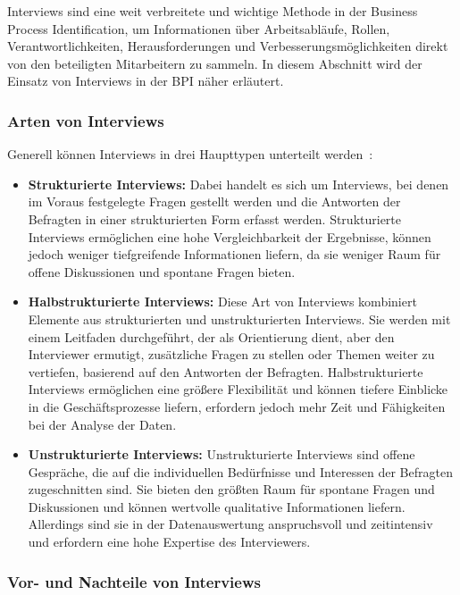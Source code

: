 Interviews sind eine weit verbreitete und wichtige Methode in der Business Process Identification, um Informationen über Arbeitsabläufe, Rollen, Verantwortlichkeiten, Herausforderungen und Verbesserungsmöglichkeiten direkt von den beteiligten Mitarbeitern zu sammeln. In diesem Abschnitt wird der Einsatz von Interviews in der BPI näher erläutert.

\subsubsection{Arten von Interviews}
Generell können Interviews in drei Haupttypen unterteilt werden~\cite[P.9]{Yousuf2015}:

\begin{itemize}
    \item \textbf{Strukturierte Interviews:} Dabei handelt es sich um Interviews, bei denen im Voraus festgelegte Fragen gestellt werden und die Antworten der Befragten in einer strukturierten Form erfasst werden. Strukturierte Interviews ermöglichen eine hohe Vergleichbarkeit der Ergebnisse, können jedoch weniger tiefgreifende Informationen liefern, da sie weniger Raum für offene Diskussionen und spontane Fragen bieten.
    \item \textbf{Halbstrukturierte Interviews:} Diese Art von Interviews kombiniert Elemente aus strukturierten und unstrukturierten Interviews. Sie werden mit einem Leitfaden durchgeführt, der als Orientierung dient, aber den Interviewer ermutigt, zusätzliche Fragen zu stellen oder Themen weiter zu vertiefen, basierend auf den Antworten der Befragten. Halbstrukturierte Interviews ermöglichen eine größere Flexibilität und können tiefere Einblicke in die Geschäftsprozesse liefern, erfordern jedoch mehr Zeit und Fähigkeiten bei der Analyse der Daten.
    \item \textbf{Unstrukturierte Interviews:} Unstrukturierte Interviews sind offene Gespräche, die auf die individuellen Bedürfnisse und Interessen der Befragten zugeschnitten sind. Sie bieten den größten Raum für spontane Fragen und Diskussionen und können wertvolle qualitative Informationen liefern. Allerdings sind sie in der Datenauswertung anspruchsvoll und zeitintensiv und erfordern eine hohe Expertise des Interviewers.
\end{itemize}


\subsubsection{Vor- und Nachteile von Interviews}

